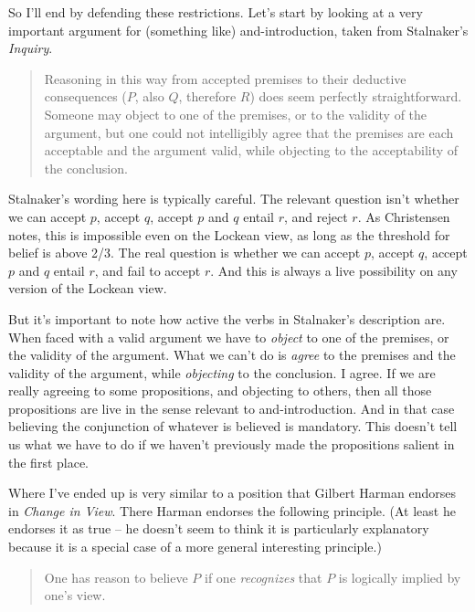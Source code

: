 \documentclass[11pt,]{book}
\begin{document}
So I'll end by defending these restrictions. Let's start by looking at a very important argument for (something like) and-introduction, taken from Stalnaker's \emph{Inquiry}.

\begin{quote}
Reasoning in this way from accepted premises to their deductive consequences (\(P\), also \(Q\), therefore \(R\)) does seem perfectly straightforward. Someone may object to one of the premises, or to the validity of the argument, but one could not intelligibly agree that the premises are each acceptable and the argument valid, while objecting to the acceptability of the conclusion. \citep[ 92]{Stalnaker1984}
\end{quote}

Stalnaker's wording here is typically careful. The relevant question isn't whether we can accept \(p\), accept \(q\), accept \(p\) and \(q\) entail \(r\), and reject \(r\). As Christensen \citeyearpar[ Ch. 4]{Christensen2005} notes, this is impossible even on the Lockean view, as long as the threshold for belief is above 2/3. The real question is whether we can accept \(p\), accept \(q\), accept \(p\) and \(q\) entail \(r\), and fail to accept \(r\). And this is always a live possibility on any version of the Lockean view.

But it's important to note how active the verbs in Stalnaker's description are. When faced with a valid argument we have to \emph{object} to one of the premises, or the validity of the argument. What we can't do is \emph{agree} to the premises and the validity of the argument, while \emph{objecting} to the conclusion. I agree. If we are really agreeing to some propositions, and objecting to others, then all those
propositions are live in the sense relevant to and-introduction. And in that case believing the conjunction of whatever is believed is mandatory. This doesn't tell us what we have to do if we haven't previously made the propositions salient in the first place.

Where I've ended up is very similar to a position that Gilbert Harman endorses in \emph{Change in View}. There Harman endorses the following principle. (At least he endorses it as true -- he doesn't seem to think it is particularly explanatory because it is a special case of a more general interesting principle.)

\begin{quote}
One has reason to believe \(P\) if one \emph{recognizes} that \(P\) is logically
implied by one's view. \citep[ 17]{Harman1986}
\end{quote}
\end{document}
